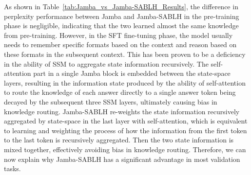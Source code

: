\documentclass{article}
\theoremstyle{plain}
\theoremstyle{definition}
\theoremstyle{remark}
\begin{document}
As shown in Table~\ref{tab:Jamba_vs_Jamba-SABLH_Results}, the difference in perplexity performance between Jamba and Jamba-SABLH in the pre-training phase is negligible, indicating that the two learned almost the same knowledge from pre-training. However, in the SFT fine-tuning phase, the model usually needs to remember specific formats based on the context and reason based on these formats in the subsequent context. This has been proven to be a deficiency in the ability of SSM to aggregate state information recursively. The self-attention part in a single Jamba block is embedded between the state-space layers, resulting in the information state produced by the ability of self-attention to route the knowledge of each answer directly to a single answer token being decayed by the subsequent three SSM layers, ultimately causing bias in knowledge routing.
Jamba-SABLH re-weights the state information recursively aggregated by state-space in the last layer with self-attention, which is equivalent to learning and weighting the process of how the information from the first token to the last token is recursively aggregated. Then the two state information is mixed together, effectively avoiding bias in knowledge routing. Therefore, we can now explain why Jamba-SABLH has a significant advantage in most validation tasks.
\end{document}
